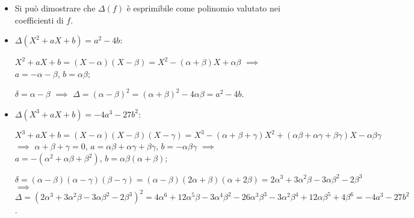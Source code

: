 \begin{itemize}
\item Si pu\`o dimostrare che \(\Delta(f)\) è esprimibile come polinomio valutato nei coefficienti di \(f\).
\item \(\Delta(X^2+aX+b)=a^2-4b\):
\smallskip

\(X^2+aX+b=(X-\alpha)(X-\beta)=X^2-(\alpha+\beta)X+\alpha\beta\) \(\implies\) \(a=-\alpha-\beta\), \(b=\alpha\beta\);

\(\delta=\alpha-\beta\) \(\implies\) \(\Delta=(\alpha-\beta)^2=(\alpha+\beta)^2-4\alpha\beta=a^2-4b\).
\item \(\Delta(X^3+aX+b)=-4a^3-27b^2\):
\smallskip

\(X^3+aX+b=(X-\alpha)(X-\beta)(X-\gamma)=X^3-(\alpha+\beta+\gamma)X^2+(\alpha\beta+\alpha\gamma+\beta\gamma)X-\alpha\beta\gamma\) \(\implies\) \(\alpha+\beta+\gamma=0\), \(a=\alpha\beta+\alpha\gamma+\beta\gamma\), \(b=-\alpha\beta\gamma\) \(\implies\) \(a=-(\alpha^2+\alpha\beta+\beta^2)\), \(b=\alpha\beta(\alpha+\beta)\);

\(\delta=(\alpha-\beta)(\alpha-\gamma)(\beta-\gamma)=(\alpha-\beta)(2\alpha+\beta)(\alpha+2\beta)=2\alpha^3+3\alpha^2\beta-3\alpha\beta^2-2\beta^3\) \(\implies\) \(\Delta=(2\alpha^3+3\alpha^2\beta-3\alpha\beta^2-2\beta^3)^2=4\alpha^6+12\alpha^5\beta-3\alpha^4\beta^2-26\alpha^3\beta^3-3\alpha^2\beta^4+12\alpha\beta^5+4\beta^6=-4a^3-27b^2\).
\end{itemize}




